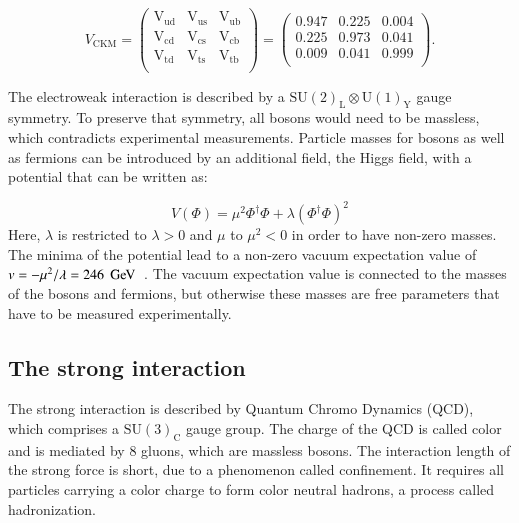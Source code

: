  \begin{equation}
V_{\mathrm{CKM}}=  
\begin{pmatrix}
\mathrm{V}_{\mathrm{ud}} & \mathrm{V}_{\mathrm{us}} & \mathrm{V}_{\mathrm{ub}} \\
\mathrm{V}_{\mathrm{cd}} & \mathrm{V}_{\mathrm{cs}} & \mathrm{V}_{\mathrm{cb}} \\
\mathrm{V}_{\mathrm{td}} & \mathrm{V}_{\mathrm{ts}} & \mathrm{V}_{\mathrm{tb}} \\
\end{pmatrix}
= 
\begin{pmatrix}
0.947 & 0.225 & 0.004 \\
0.225 & 0.973 & 0.041 \\
0.009 & 0.041 & 0.999 \\
\end{pmatrix}
.
\label{eq:theo_ckm}
\end{equation}

The electroweak interaction is described by a  $\mathrm{SU}(2)_\mathrm{L}\otimes \mathrm{U}(1)_\mathrm{Y}$ gauge symmetry. To preserve that symmetry, all bosons would need to be massless, which contradicts experimental
measurements. 
Particle masses for bosons as well as fermions can be introduced by an additional field, the Higgs field, with a potential that can be written as:

\begin{equation}
V(\Phi) =  \mu^2 \Phi^\dagger \Phi + \lambda(\Phi^\dagger \Phi)^2
\end{equation}
Here, $\lambda$ is restricted to $\lambda > 0$ and $\mu$ to $\mu^2<0$ in order to have non-zero masses. The minima of the potential lead to a non-zero vacuum expectation value of $v = - \mu^2 / \lambda = 246 \; \,\text{Ge\hspace{-.08em}V}$~\cite{Olive:2016xmw}.
The vacuum expectation value is connected to the masses of the bosons and fermions, but otherwise these masses are free parameters that have to be measured experimentally.

\subsection{The strong interaction}
\label{sec:theo_qcd}

The strong interaction is described by Quantum Chromo Dynamics (QCD), which comprises a $\mathrm{SU}(3)_\mathrm{C}$ gauge group. The charge of the QCD is called color and is mediated by 8 gluons, which are massless bosons.
The interaction length of the strong force is short, due to a phenomenon called confinement. It requires all particles carrying a color charge to form color neutral hadrons, a process called hadronization.

